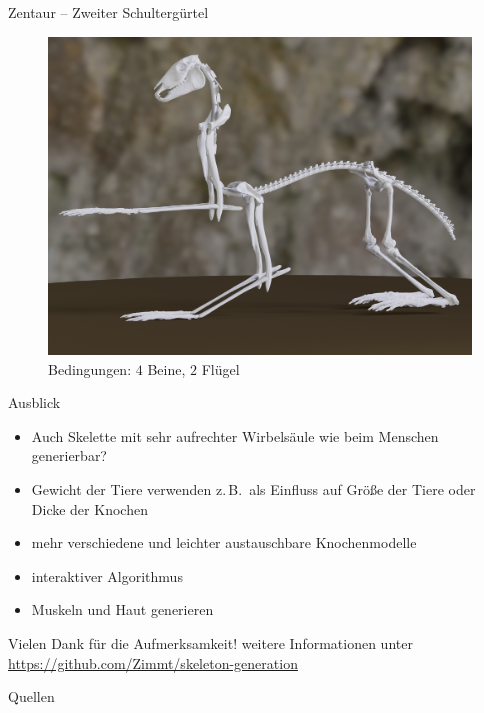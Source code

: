 \documentclass{beamer}
\newcommand{\zb}{z.\,B.\ }
\begin{document}
\begin{frame}{Zentaur -- Zweiter Schultergürtel}
 \begin{figure}
  \centering
  \includegraphics[height=0.75\textheight]{../../java_skeleton_generation/example_skeletons/zentaur2.jpg}
  \caption{Bedingungen: $4$ Beine, $2$ Flügel}
 \end{figure}
\end{frame}

\begin{frame}{Ausblick}
 \begin{itemize}
  \item Auch Skelette mit sehr aufrechter Wirbelsäule wie beim Menschen generierbar?
  \item Gewicht der Tiere verwenden \zb als Einfluss auf Größe der Tiere oder Dicke der Knochen
  \item mehr verschiedene und leichter austauschbare Knochenmodelle
  \item interaktiver Algorithmus
  \item Muskeln und Haut generieren
 \end{itemize}
\end{frame}


\begin{frame}[focus]
 Vielen Dank für die Aufmerksamkeit!
 \vfill
 \small weitere Informationen unter \url{https://github.com/Zimmt/skeleton-generation}
\end{frame}

\appendix
\begin{frame}[shrink=5]{Quellen}
 \printbibliography[heading=bibintoc]
\end{frame}
\end{document}
